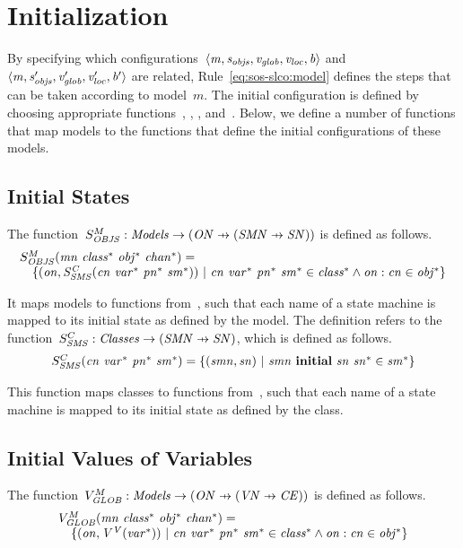 \section{Initialization}
\label{sec:sos-slco:initialization}
By specifying which configurations~$\langle \it{m}, s_{\it{objs}}, v_{\it{glob}}, v_{\it{loc}}, b \rangle$ and $\langle \it{m}, s_{\it{objs}}', v_{\it{glob}}', v_{\it{loc}}', b' \rangle$ are related, Rule~\eqref{eq:sos-slco:model} defines the steps that can be taken according to model~$m$.
The initial configuration is defined by choosing appropriate functions~\sobjs, \vglob, \vloc, and~\buf.
Below, we define a number of functions that map \SLCO models to the functions that define the initial configurations of these models.

\subsection{Initial States}
The function~$S^M_{\it{OBJS}} : \Models \to (\ObjectNames \pfun (\StateMachineNames \pfun \StateNames))$ is defined as follows.
%
\[
\begin{array}{l}
S^M_{\it{OBJS}}(\it{mn}~\it{class^*}~\it{obj^*}~\it{chan^*}) = \\
\quad
\{(\it{on}, S^C_{SMS}(\it{cn}~\it{var^*}~\it{pn^*}~\it{sm^*})) ~ | ~ \it{cn}~\it{var^*}~\it{pn^*}~\it{sm^*} \in \it{class^*} \wedge \it{on}:\it{cn} \in \it{obj^*} \}
\end{array}
\]

\noindent
It maps models to functions from~\SOBJS, such that each name of a state machine is mapped to its initial state as defined by the model.
The definition refers to the function~$S^C_{\it{SMS}} : \Classes \to (\StateMachineNames \pfun \StateNames)$, which is defined as follows.
%
\[
\begin{array}{l}
S^C_{\it{SMS}}(\it{cn}~\it{var^*}~\it{pn^*}~\it{sm^*}) =
\{(\it{smn}, \it{sn}) ~ | ~ \it{smn}~\textbf{initial}~\it{sn}~\it{sn^*} \in \it{sm^*} \}
\end{array}
\]

\noindent
This function maps classes to functions from~\SSMS, such that each name of a state machine is mapped to its initial state as defined by the class.

\subsection{Initial Values of Variables}
The function~$V^M_{\it{GLOB}} : \Models \to (\ObjectNames \pfun (\VariableNames \pfun \ConstantExpressions))$ is defined as follows.
%
\[
\begin{array}{l}
V^M_{\it{GLOB}}(\it{mn}~\it{class^*}~\it{obj^*}~\it{chan^*}) = \\
\quad \{(\it{on}, V^V(\it{var^*})) ~ | ~ \it{cn}~\it{var^*}~\it{pn^*}~\it{sm^*} \in \it{class^*} \wedge \it{on}:\it{cn} \in \it{obj^*} \}
\end{array}
\]


